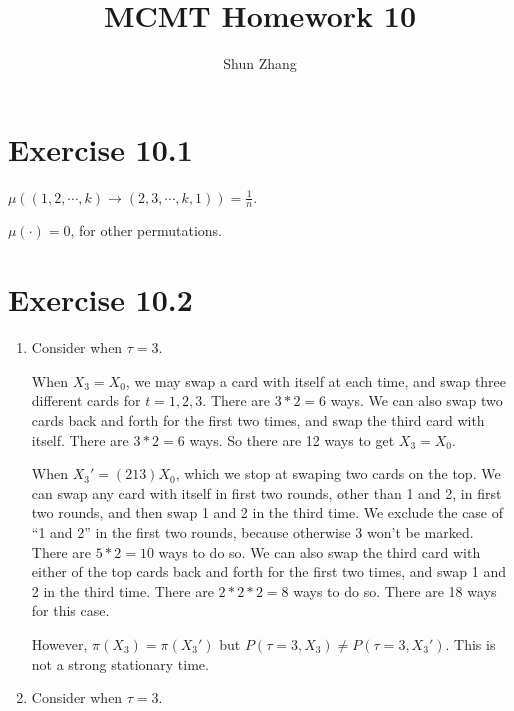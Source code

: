 \documentclass[10pt]{article}
\title{MCMT Homework 10}
\author{Shun Zhang}
\date{}
\begin{document}
\maketitle

\section*{Exercise 10.1}

$\mu((1, 2, \cdots, k) \rightarrow (2, 3, \cdots, k, 1)) = \frac{1}{n}$.

$\mu(\cdot) = 0$, for other permutations.

\section*{Exercise 10.2}

\begin{enumerate}
\item Consider when $\tau = 3$.

When $X_3 = X_0$, we may swap a card with itself at each time, and swap three
different cards for $t = 1, 2, 3$. There are $3 * 2 = 6$ ways. We can also swap
two cards back and forth for the first two times, and swap the third card with
itself. There are $3 * 2 = 6$ ways. So there are 12 ways to get $X_3 = X_0$.

When $X_3' = (2 1 3)X_0$, which we stop at swaping two cards on the top. We can
swap any card with itself in first two rounds, other than 1 and 2, in first two
rounds, and then swap 1 and 2 in the third time. We exclude the case of ``1
and 2'' in the first two rounds, because otherwise 3 won't be marked. There are
$5 * 2 = 10$ ways to do so.
We can also swap the third card with either of the top cards back and forth for
the first two times, and swap 1 and 2 in the third time. There are $2 * 2 * 2 =
8$ ways to do so. There are 18 ways for this case.

However, $\pi(X_3) = \pi(X_3')$ but $P(\tau = 3, X_3) \neq P(\tau = 3, X_3')$.
This is not a strong stationary time.

\item Consider when $\tau = 3$.
\end{enumerate}
\end{document}
